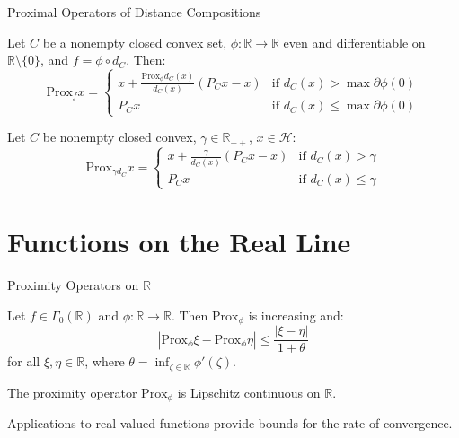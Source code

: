 \documentclass[aspectratio=169,10pt]{beamer}
\begin{document}
\begin{frame}{Proximal Operators of Distance Compositions}
\begin{proposition}
Let $C$ be a nonempty closed convex set, $\phi: \mathbb{R} \to \mathbb{R}$ even and differentiable on $\mathbb{R} \setminus \{0\}$, and $f = \phi \circ d_C$. Then:
\[
\mathrm{Prox}_f x = \begin{cases}
x + \frac{\mathrm{Prox}_\phi d_C(x)}{d_C(x)}(P_C x - x) & \text{if } d_C(x) > \max \partial\phi(0) \\
P_C x & \text{if } d_C(x) \leq \max \partial\phi(0)
\end{cases}
\]
\end{proposition}

\vspace{0.3cm}

\begin{example}
Let $C$ be nonempty closed convex, $\gamma \in \mathbb{R}_{++}$, $x \in \mathcal{H}$:
\[
\mathrm{Prox}_{\gamma d_C} x = \begin{cases}
x + \frac{\gamma}{d_C(x)}(P_C x - x) & \text{if } d_C(x) > \gamma \\
P_C x & \text{if } d_C(x) \leq \gamma
\end{cases}
\]
\end{example}
\end{frame}

\section{Functions on the Real Line}

\begin{frame}{Proximity Operators on $\mathbb{R}$}
\begin{theorem}
Let $f \in \Gamma_0(\mathbb{R})$ and $\phi: \mathbb{R} \to \mathbb{R}$. Then $\mathrm{Prox}_\phi$ is increasing and:
\[
|\mathrm{Prox}_\phi \xi - \mathrm{Prox}_\phi \eta| \leq \frac{|\xi - \eta|}{1 + \theta}
\]
for all $\xi, \eta \in \mathbb{R}$, where $\theta = \inf_{\zeta \in \mathbb{R}} \phi'(\zeta)$.
\end{theorem}

\vspace{0.3cm}

\begin{corollary}
The proximity operator $\mathrm{Prox}_\phi$ is Lipschitz continuous on $\mathbb{R}$.
\end{corollary}

\vspace{0.3cm}

Applications to real-valued functions provide bounds for the rate of convergence.
\end{frame}
\end{document}
